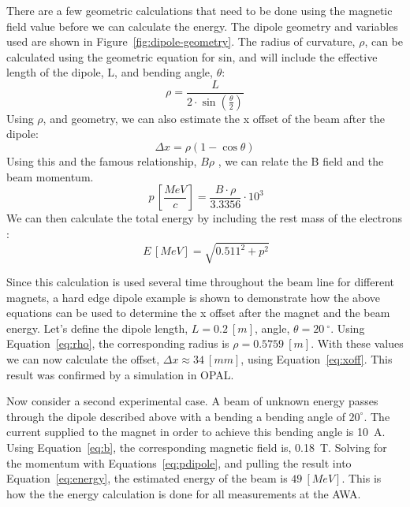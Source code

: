 There are a few geometric calculations that need to be done using the magnetic field value
before we can calculate the energy. The dipole geometry and variables used are shown in Figure~\ref{fig:dipole-geometry}.
The radius of curvature, $\rho$, can be calculated using the geometric equation for sin, and 
will include the effective length of the dipole, L, and bending angle, $\theta$:
\begin{equation}
	\rho = \frac{L}{2\cdot \sin(\frac{\theta}{2})}
\end{equation}\label{eq:rho}
Using $\rho$, and geometry, we can also estimate the x offset of the
beam after the dipole: 
\begin{equation}
	\Delta x = \rho \left( 1- \cos\theta \right)
\end{equation}\label{eq:xoff}
Using this and the famous relationship, $B\rho$ \cite{Wiedemann},
we can relate the B field and the beam momentum. %
\begin{equation}
	\SI{}{p\,\left[\frac{MeV}{c}\right]} = \frac{B\cdot \rho}{3.3356}\cdot 10^3
	\label{eq:pdipole}
\end{equation}
We can then calculate the total energy by including the rest mass of the electrons \cite{Griffiths}:
\begin{equation}
	\SI{}{E\,[MeV]} = \sqrt{0.511^2+p^2}
	\label{eq:energy}
\end{equation}

Since this calculation is used several time throughout the 
beam line for different magnets, a hard edge dipole example is shown 
to demonstrate how the above equations can be used to determine
the x offset after the magnet and the beam energy. 
Let's define the dipole length, $L=\SI{0.2}{[m]}$, angle, $\theta=\SI{20}{^\circ}$. 
Using Equation~\ref{eq:rho}, 
the corresponding radius is $\rho = \SI{0.5759}{[m]}$. 
With these values we can now calculate the offset, $\Delta x \approx \SI{34}{[mm]}$, 
using Equation~\ref{eq:xoff}. This result was confirmed by a simulation in OPAL. 

Now consider a second experimental case.
A beam of unknown energy passes through the dipole described above
with a bending a bending angle of $20^\circ$. 
The current supplied to the magnet in order to achieve this bending angle is \SI{10}{A}.
Using Equation~\ref{eq:b}, the corresponding magnetic field is, \SI{0.18}{T}.
Solving for the momentum with Equations~\ref{eq:pdipole}, and pulling the 
result into Equation~\ref{eq:energy}, 
the estimated energy of the beam is $\SI{49}{[MeV]}$.
This is how the the energy calculation is done for all measurements at the AWA.


